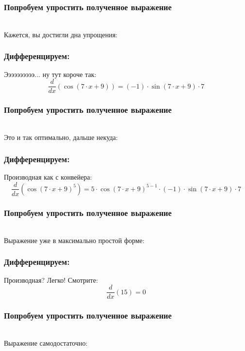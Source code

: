 \documentclass[a4paper,12pt]{article}
\begin{document}
\subsubsection*{Попробуем упростить полученное выражение}
\\Кажется, вы достигли дна упрощения:

\subsubsection*{Дифференцируем:}

Ээээээээээ... ну тут короче так:
\begin{dmath}\frac{d}{dx}\left(\operatorname{cos}\left(7\cdot x+ 9\right) \right)=(-1)\cdot \operatorname{sin}\left(7\cdot x+ 9\right) \cdot 7\end{dmath}
\subsubsection*{Попробуем упростить полученное выражение}
\\Это и так оптимально, дальше некуда:

\subsubsection*{Дифференцируем:}

Производная как с конвейера:
\begin{dmath}\frac{d}{dx}\left(\operatorname{cos}\left(7\cdot x+ 9\right) ^{5}\right)=5\cdot \operatorname{cos}\left(7\cdot x+ 9\right) ^{5- 1}\cdot (-1)\cdot \operatorname{sin}\left(7\cdot x+ 9\right) \cdot 7\end{dmath}
\subsubsection*{Попробуем упростить полученное выражение}
\\Выражение уже в максимально простой форме:

\subsubsection*{Дифференцируем:}

Производная? Легко! Смотрите:
\begin{dmath}\frac{d}{dx}\left(15\right)=0\end{dmath}
\subsubsection*{Попробуем упростить полученное выражение}
\\Выражение самодостаточно:
\end{document}
